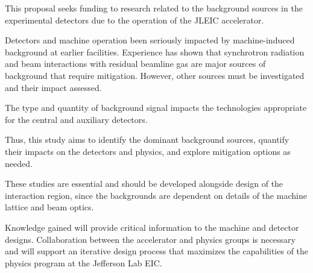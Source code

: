 This proposal seeks funding to research related to the background sources in the experimental detectors due to the operation of the JLEIC accelerator.


Detectors and machine operation been seriously impacted by machine-induced background at earlier facilities.  Experience has shown that synchrotron radiation and beam interactions with residual beamline gas are major sources of background that require mitigation.  However, other sources must be investigated and their impact assessed.

The type and quantity of background signal impacts the technologies appropriate for the central and auxiliary detectors.

Thus, this study aims to identify the dominant background sources, quantify their impacts on the detectors and physics, and explore mitigation options as needed.

These studies are essential and should be developed alongside design of the interaction region, since the backgrounds are dependent on details of the machine lattice and beam optics.   

Knowledge gained will provide critical information to the machine and detector designs.  Collaboration between the accelerator and physics groups is necessary and will support an iterative design process that maximizes the capabilities of the physics program at the Jefferson Lab EIC.

